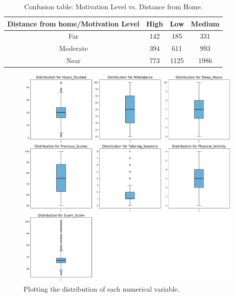 \documentclass[twocolumn]{article} %
\begin{document}
\begin{table}[ht]
  \centering
  \begin{tabular}{|c|c|c|c|}
      \hline
      \textbf{Distance from home/Motivation Level} & \textbf{High} & \textbf{Low} & \textbf{Medium} \\ \hline
      Far       & 142   & 185   & 331   \\ \hline
      Moderate  & 394   & 611   & 993   \\ \hline
      Near      & 773   & 1125  & 1986  \\ \hline
  \end{tabular}
  \caption{Confusion table: Motivation Level vs. Distance from Home.}
  \label{tab:confusion3}
\end{table}

\renewcommand{\figurename}{Supplementary Figure}
\setcounter{figure}{1}

\begin{figure}[h]
  \centering
  \includegraphics[width=0.9\columnwidth]{2-boxplots.png}
  \caption{Plotting the distribution of each numerical variable.}
  \label{2:boxplots}
\end{figure}
\end{document}
